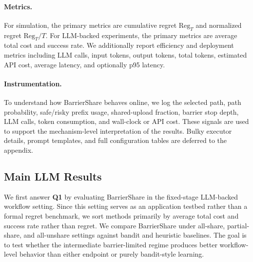 \documentclass{article}
\begin{document}
\paragraph{Metrics.}
For simulation, the primary metrics are cumulative regret $\mathrm{Reg}_T$ and normalized regret $\mathrm{Reg}_T/T$. For LLM-backed experiments, the primary metrics are average total cost and success rate. We additionally report efficiency and deployment metrics including LLM calls, input tokens, output tokens, total tokens, estimated API cost, average latency, and optionally p95 latency.

\paragraph{Instrumentation.}
To understand how BarrierShare behaves online, we log the selected path, path probability, safe/risky prefix usage, shared-upload fraction, barrier stop depth, LLM calls, token consumption, and wall-clock or API cost. These signals are used to support the mechanism-level interpretation of the results. Bulky executor details, prompt templates, and full configuration tables are deferred to the appendix.

\subsection{Main LLM Results}

We first answer \textbf{Q1} by evaluating BarrierShare in the fixed-stage LLM-backed workflow setting. Since this setting serves as an application testbed rather than a formal regret benchmark, we sort methods primarily by average total cost and success rate rather than regret. We compare BarrierShare under all-share, partial-share, and all-unshare settings against bandit and heuristic baselines. The goal is to test whether the intermediate barrier-limited regime produces better workflow-level behavior than either endpoint or purely bandit-style learning.
\end{document}

